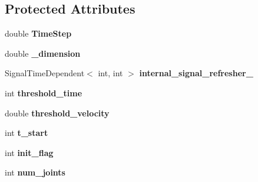 \subsection*{Protected Attributes}
\begin{DoxyCompactItemize}
\item 
double {\bfseries Time\+Step}\hypertarget{classdynamicgraph_1_1sot_1_1Calibrator_a30bf880e9dfe606ae6cf739c7219eb42}{}\label{classdynamicgraph_1_1sot_1_1Calibrator_a30bf880e9dfe606ae6cf739c7219eb42}

\item 
double {\bfseries \+\_\+dimension}\hypertarget{classdynamicgraph_1_1sot_1_1Calibrator_a3956efff5e214a4e2601c06af3e83b2c}{}\label{classdynamicgraph_1_1sot_1_1Calibrator_a3956efff5e214a4e2601c06af3e83b2c}

\item 
Signal\+Time\+Dependent$<$ int, int $>$ {\bfseries internal\+\_\+signal\+\_\+refresher\+\_\+}\hypertarget{classdynamicgraph_1_1sot_1_1Calibrator_aed6ee9962cfb1eb2ab8cc86c3a43717f}{}\label{classdynamicgraph_1_1sot_1_1Calibrator_aed6ee9962cfb1eb2ab8cc86c3a43717f}

\item 
int {\bfseries threshold\+\_\+time}\hypertarget{classdynamicgraph_1_1sot_1_1Calibrator_ad3152e70f44f8dec8ccac4c32b6adab2}{}\label{classdynamicgraph_1_1sot_1_1Calibrator_ad3152e70f44f8dec8ccac4c32b6adab2}

\item 
double {\bfseries threshold\+\_\+velocity}\hypertarget{classdynamicgraph_1_1sot_1_1Calibrator_a4c17d73e9b54aefc871d1fb15426cdee}{}\label{classdynamicgraph_1_1sot_1_1Calibrator_a4c17d73e9b54aefc871d1fb15426cdee}

\item 
int {\bfseries t\+\_\+start}\hypertarget{classdynamicgraph_1_1sot_1_1Calibrator_ae3d9e473f0efd316bf92705c140ca148}{}\label{classdynamicgraph_1_1sot_1_1Calibrator_ae3d9e473f0efd316bf92705c140ca148}

\item 
int {\bfseries init\+\_\+flag}\hypertarget{classdynamicgraph_1_1sot_1_1Calibrator_a7a16d99f232e4ae6fb08d3f063bd2cf2}{}\label{classdynamicgraph_1_1sot_1_1Calibrator_a7a16d99f232e4ae6fb08d3f063bd2cf2}

\item 
int {\bfseries num\+\_\+joints}\hypertarget{classdynamicgraph_1_1sot_1_1Calibrator_a904f0fa17b886446411d1a65d54192b9}{}\label{classdynamicgraph_1_1sot_1_1Calibrator_a904f0fa17b886446411d1a65d54192b9}


\end{DoxyCompactItemize}
